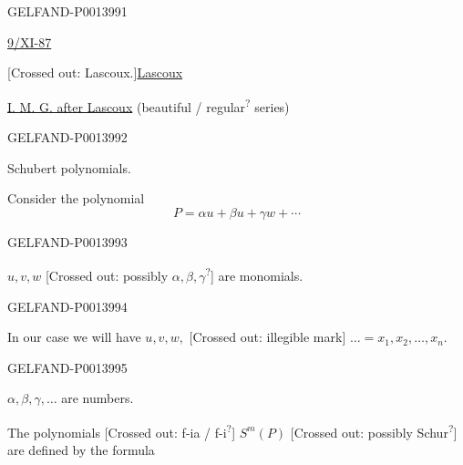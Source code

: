 \begin{GelfandAdjacentEvidence}{GELFAND-P001399}{1}

\uline{9/XI-87 }\qquad {}

[Crossed out: Lascoux.]\qquad \uline{Lascoux}

\uline{I. M. G. after Lascoux}
(beautiful / regular\textsuperscript{?} series)

\end{GelfandAdjacentEvidence}
\begin{GelfandAdjacentEvidence}{GELFAND-P001399}{2}



Schubert polynomials.

Consider the polynomial
\begin{equation*}
P=\alpha u+\beta u+\gamma w+\cdots \tag{1}
\end{equation*}
\end{GelfandAdjacentEvidence}
\begin{GelfandAdjacentEvidence}{GELFAND-P001399}{3}


\(u,v,w\) [Crossed out: possibly \(\alpha,\beta,\gamma\)\textsuperscript{?}] are monomials.

\end{GelfandAdjacentEvidence}
\begin{GelfandAdjacentEvidence}{GELFAND-P001399}{4}



In our case we will have \(u,v,w,\)
[Crossed out: illegible mark]
\(\ldots=x_1,x_2,\ldots,x_n\).

\end{GelfandAdjacentEvidence}
\begin{GelfandAdjacentEvidence}{GELFAND-P001399}{5}



\(\alpha,\beta,\gamma,\ldots\) are numbers.

The polynomials [Crossed out: f-ia / f-i\textsuperscript{?}]
\(S^m(P)\) [Crossed out: possibly Schur\textsuperscript{?}]
are defined by the formula


\end{GelfandAdjacentEvidence}
